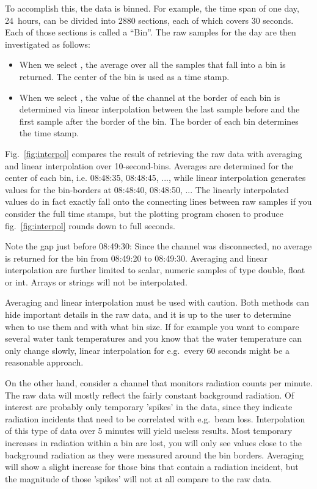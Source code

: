 \noindent To accomplish this, the data is binned. For example, the
time span of one day, 24~hours, can be divided into 2880 sections,
each of which covers 30 seconds. Each of those sections is called a
``Bin''. The raw samples for the day are then investigated as follows:
\begin{itemize}
\item When we select , the average over all the
  samples that fall into a bin is returned. The center of the bin is
  used as a time stamp.
\item When we select , the value of the
  channel at the border of each bin is determined via linear
  interpolation between the last sample before and the first sample
  after the border of the bin.
  The border of each bin determines the time stamp.
\end{itemize}

\noindent Fig.~\ref{fig:interpol} compares the result of retrieving
the raw data with averaging and linear interpolation over
10-second-bins.  Averages are determined for the center of each bin,
i.e. 08:48:35, 08:48:45, ..., while linear interpolation generates
values for the bin-borders at 08:48:40, 08:48:50, ...  The linearly
interpolated values do in fact exactly fall onto the connecting lines
between raw samples if you consider the full time stamps, but the
plotting program chosen to produce fig.~\ref{fig:interpol} rounds down
to full seconds.

Note the gap just before 08:49:30: Since the channel was disconnected,
no average is returned for the bin from 08:49:20 to 08:49:30. 
Averaging and linear interpolation are further limited to scalar, numeric
samples of type double, float or int. Arrays or strings will not be
interpolated.

\NOTE Averaging and linear interpolation must be used with caution.
Both methods can hide important details in the raw data, and it is up
to the user to determine when to use them and with what bin size.
If for example you want to compare several water tank temperatures
and you know that the water temperature can only change slowly, linear
interpolation for e.g.\ every 60 seconds might be a reasonable
approach.

On the other hand, consider a channel that monitors radiation counts
per minute. The raw data will mostly reflect the fairly constant background
radiation. Of interest are probably only temporary 'spikes' in the data,
since they indicate radiation incidents that need to be correlated
with e.g.\ beam loss.
Interpolation of this type of data over 5 minutes will yield
useless results. Most temporary increases in radiation within a bin are
lost, you will only see values close to the background radiation as
they were measured around the bin borders.
Averaging will show a slight increase for those bins that contain a
radiation incident, but the magnitude of those 'spikes' will not at
all compare to the raw data.


